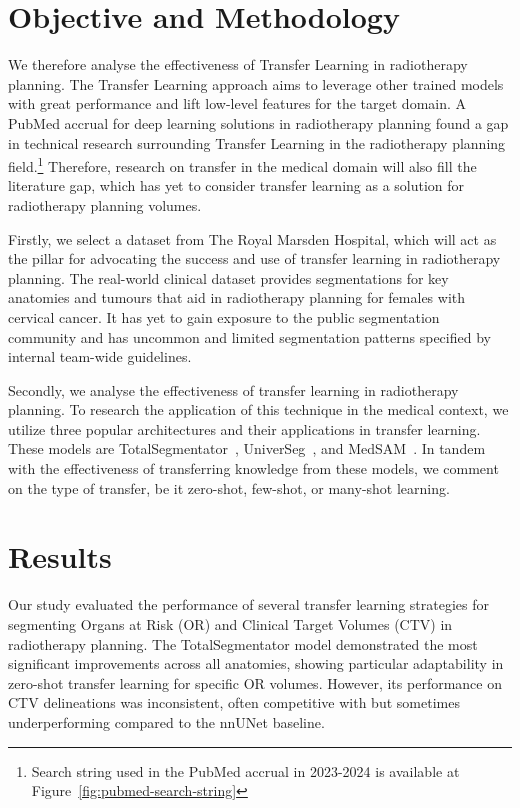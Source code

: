 \documentclass[11pt,twoside]{report}
\begin{document}
\section{Objective and Methodology}

We therefore analyse the effectiveness of Transfer Learning in radiotherapy planning. The Transfer Learning approach aims to leverage other trained models with great performance and lift low-level features for the target domain. A PubMed accrual for deep learning solutions in radiotherapy planning found a gap in technical research surrounding Transfer Learning in the radiotherapy planning field.\footnote{Search string used in the PubMed accrual in 2023-2024 is available at Figure~\ref{fig:pubmed-search-string}} Therefore, research on transfer in the medical domain will also fill the literature gap, which has yet to consider transfer learning as a solution for radiotherapy planning volumes. 

Firstly, we select a dataset from The Royal Marsden Hospital, which will act as the pillar for advocating the success and use of transfer learning in radiotherapy planning. The real-world clinical dataset provides segmentations for key anatomies and tumours that aid in radiotherapy planning for females with cervical cancer. It has yet to gain exposure to the public segmentation community and has uncommon and limited segmentation patterns specified by internal team-wide guidelines.

Secondly, we analyse the effectiveness of transfer learning in radiotherapy planning. To research the application of this technique in the medical context, we utilize three popular architectures and their applications in transfer learning. These models are TotalSegmentator~\cite{nnunet,totalsegmentor-paper}, UniverSeg~\cite{universeg}, and MedSAM~\cite{Ma2024}. In tandem with the effectiveness of transferring knowledge from these models, we comment on the type of transfer, be it zero-shot, few-shot, or many-shot learning.

\section{Results}

Our study evaluated the performance of several transfer learning strategies for segmenting Organs at Risk (OR) and Clinical Target Volumes (CTV) in radiotherapy planning. The TotalSegmentator model demonstrated the most significant improvements across all anatomies, showing particular adaptability in zero-shot transfer learning for specific OR volumes. However, its performance on CTV delineations was inconsistent, often competitive with but sometimes underperforming compared to the nnUNet baseline.
\end{document}
